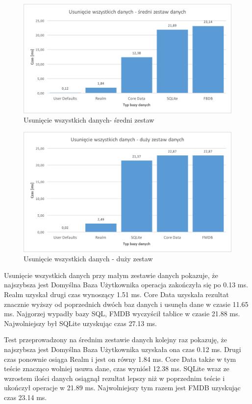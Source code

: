 \begin{figure}[H]
\centering
	\includegraphics[width=15cm]{img/delete_data/delete_all/delete_all_medium_test.png}
	\caption{Usunięcie wszystkich danych- średni zestaw}
	\label{fig: delete-all-medium}
\end{figure}

\begin{figure}[H]
\centering
	\includegraphics[width=15cm]{img/delete_data/delete_all/delete_all_big_test.png}
	\caption{Usunięcie wszystkich danych - duży zestaw}
	\label{fig: delete-all-big}
\end{figure}

Usunięcie wszystkich danych przy małym zestawie danych pokazuje, że najszybsza jest Domyślna Baza Użytkownika operacja zakończyła się po 0.13 ms. Realm uzyskał drugi czas wynoszący 1.51 ms. Core Data uzyskała rezultat znacznie wyższy od poprzednich dwóch baz danych i usunęła dane w czasie 11.65 ms. Najgorzej wypadły bazy SQL, FMDB wyczyścił tablice w czasie 21.88 ms. Najwolniejszy był SQLite uzyskując czas 27.13 ms. 

Test przeprowadzony na średnim zestawie danych kolejny raz pokazuję, że najszybsza jest Domyślna Baza Użytkownika uzyskała ona czas 0.12 ms. Drugi czas ponownie osiąga Realm i jest on równy 1.84 ms. Core Data także w tym teście znacząco wolniej usuwa dane, czas wyniósł 12.38 ms. SQLite wraz ze wzrostem ilości danych osiągnął rezultat lepszy niż w poprzednim teście i ukończył operacje w 21.89 ms. Najwolniejszy tym razem jest FMDB uzyskując czas 23.14 ms. 

